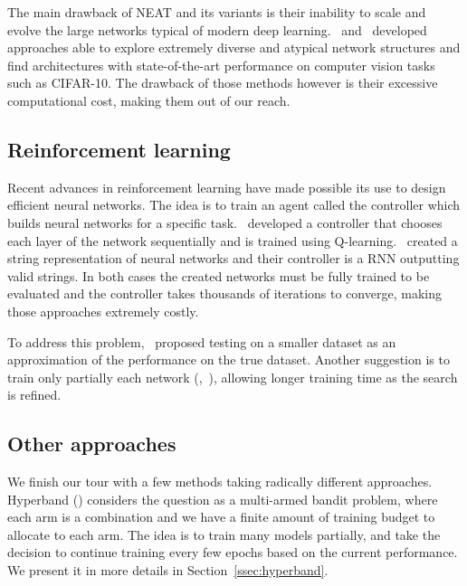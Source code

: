 The main drawback of NEAT and its variants is their inability to scale and evolve the large networks typical of modern deep learning.~\textcite{real2017ICML} and~\textcite{miikkulainen2017} developed approaches able to explore extremely diverse and atypical network structures and find architectures with state-of-the-art performance on computer vision tasks such as CIFAR-10. The drawback of those methods however is their excessive computational cost, making them out of our reach.

\subsection{Reinforcement learning}

Recent advances in reinforcement learning have made possible its use to design efficient neural networks. The idea is to train an agent called the controller which builds neural networks for a specific task.~\textcite{baker2017ICLR} developed a controller that chooses each layer of the network sequentially and is trained using Q-learning.~\textcite{zoph2017ICLR} created a string representation of neural networks and their controller is a RNN outputting valid strings. In both cases the created networks must be fully trained to be evaluated and the controller takes thousands of iterations to converge, making those approaches extremely costly.

To address this problem,~\textcite{zoph2017} proposed testing on a smaller dataset as an approximation of the performance on the true dataset. Another suggestion is to train only partially each network (\textcite{li2017ICLR},~\textcite{zela2018}), allowing longer training time as the search is refined.

\subsection{Other approaches}

We finish our tour with a few methods taking radically different approaches. Hyperband (\textcite{li2017ICLR}) considers the question as a multi-armed bandit problem, where each arm is a combination and we have a finite amount of training budget to allocate to each arm. The idea is to train many models partially, and take the decision to continue training every few epochs based on the current performance. We present it in more details in Section~\ref{ssec:hyperband}.

